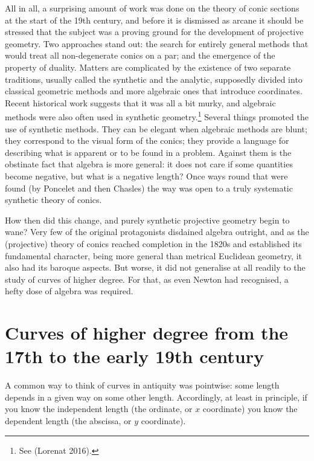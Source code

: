 All in all, a surprising amount of work was done on the theory of conic sections  at the start of the 19th century, and before it is dismissed as arcane it should be stressed that the subject was a proving ground for the development of projective geometry. Two approaches stand out: the search for entirely  general methods that would treat all non-degenerate conics on a par; and the emergence of the property of duality. Matters are complicated by the existence of two separate traditions, usually called the synthetic and the analytic, supposedly divided into classical geometric methods and more algebraic ones that introduce coordinates. 
Recent historical work suggests that it was all a bit murky, and algebraic methods were also often used in synthetic geometry.\footnote{See (Lorenat 2016).} Several things promoted the use of synthetic methods. They can be elegant when algebraic methods are blunt; they correspond to the visual form of the conics; they provide a language for describing what is apparent or to be found in a problem. Against them is the obstinate fact that algebra is more general: it does not care if some quantities become negative, but what is a negative length? Once ways round that were found (by Poncelet and then Chasles) the way was open to a truly systematic synthetic theory of conics.   

How then did this change, and purely synthetic projective geometry begin to wane? Very few of the original protagonists disdained algebra outright, and as the (projective) theory of conics reached completion in the 1820s and established its fundamental character, being more general than metrical Euclidean geometry, it also had its baroque aspects. But worse, it did not generalise at all readily  to the study of curves of higher degree. For that, as even Newton had recognised, a hefty dose of algebra was required.







\section{Curves of higher degree from the 17th to the early 19th century} A common way to think of curves in antiquity was pointwise: some length depends in a given way on some other length. Accordingly, at least in principle, if you know the independent length
(the ordinate, or $x$ coordinate) you know the dependent length (the abscissa, or $y$ coordinate).  

